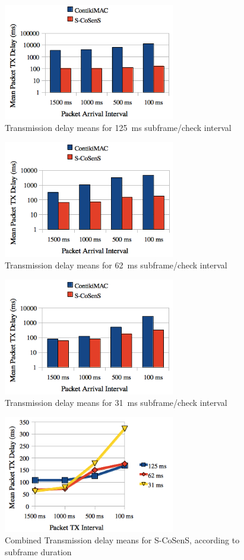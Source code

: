 \documentclass[conference]{IEEEtran}
\begin{document}
\begin{figure}
  \centering
  \includegraphics[width=7.5cm]{graphes/Delays8Hz.png}
  \caption{Transmission delay means for 125~ms subframe/check interval}
  \label{FigDelays8Hz}
\end{figure}
\begin{figure}
  \centering
  \includegraphics[width=7.5cm]{graphes/Delays16Hz.png}
  \caption{Transmission delay means for 62~ms subframe/check interval}
  \label{FigDelays16Hz}
\end{figure}
\begin{figure}
  \centering
  \includegraphics[width=7.5cm]{graphes/Delays32Hz.png}
  \caption{Transmission delay means for 31~ms subframe/check interval}
  \label{FigDelays32Hz}
\end{figure}
\begin{figure}
  \centering
  \includegraphics[width=7.5cm]{graphes/DelaysStabilitySCoSenS.png}
  \caption{Combined Transmission delay means for S-CoSenS,
           according to subframe duration}
  \label{FigDelaysSCoSenS}
\end{figure}
\end{document}
